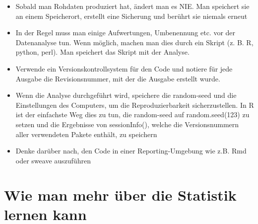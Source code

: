 \documentclass[a4paper,twoside]{tufte-book}\usepackage[]{graphicx}\usepackage[]{color}
\begin{document}
\begin{itemize}

\item{Sobald man Rohdaten produziert hat, ändert man es NIE. Man speichert sie an einem Speicherort, erstellt eine Sicherung und berührt sie niemals erneut}

\item{In der Regel muss man einige Aufwertungen, Umbenennung etc. vor der Datenanalyse tun. Wenn möglich, machen man dies durch ein Skript (z. B. R, python, perl). Man speichert das Skript mit der Analyse.}

\item{Verwende ein Versionskontrollsystem für den Code und notiere für jede Ausgabe die Revisionsnummer, mit der die Ausgabe erstellt wurde.}

\item{Wenn die Analyse durchgeführt wird, speichere die random-seed und die Einstellungen des Computers, um die Reproduzierbarkeit sicherzustellen. In R ist der einfachste Weg dies zu tun, die random-seed auf random.seed(123) zu setzen und die Ergebnisse von sessionInfo(), welche die Versionsnummern aller verwendeten Pakete enthält, zu speichern}

\item{Denke darüber nach, den Code in einer Reporting-Umgebung wie z.B. Rmd oder sweave auszuführen}



\end{itemize}

\section{Wie man mehr über die Statistik lernen kann}\label{sec: further readings}
\end{document}

